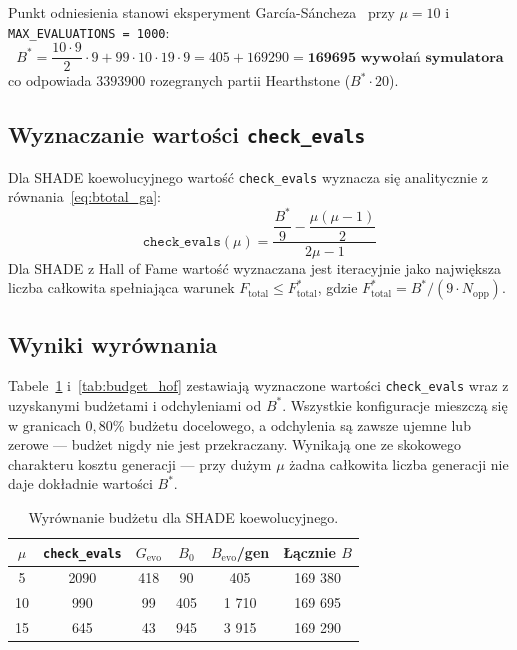 Punkt odniesienia stanowi eksperyment García-Sáncheza~\cite{sanchez2020} przy $\mu = 10$ i \texttt{MAX\_EVALUATIONS = 1000}:
\begin{equation}
    B^* = \frac{10 \cdot 9}{2} \cdot 9
        + 99 \cdot 10 \cdot 19 \cdot 9
    = 405 + 169 290
    = \mathbf{169 695 \text{ wywołań symulatora}}
    \label{eq:bstar}
\end{equation}
co odpowiada $3 393 900$ rozegranych partii Hearthstone ($B^* \cdot 20$).

\subsection{Wyznaczanie wartości \texttt{check\_evals}}

Dla SHADE koewolucyjnego wartość \texttt{check\_evals} wyznacza się analitycznie z równania~\eqref{eq:btotal_ga}:
\begin{equation}
    \texttt{check\_evals}(\mu) =
    \frac{\dfrac{B^*}{9} - \dfrac{\mu(\mu-1)}{2}}{2\mu - 1}
    \label{eq:check_coev}
\end{equation}
Dla SHADE z Hall of Fame wartość wyznaczana jest iteracyjnie jako największa liczba całkowita spełniająca warunek $F_{\text{total}} \leq F^*_{\text{total}}$, gdzie $F^*_{\text{total}} = B^* / (9 \cdot N_{\text{opp}})$.

\subsection{Wyniki wyrównania}

Tabele~\ref{tab:budget_coev} i~\ref{tab:budget_hof} zestawiają wyznaczone wartości \texttt{check\_evals} wraz z uzyskanymi budżetami i odchyleniami od $B^*$. Wszystkie konfiguracje mieszczą się w granicach $0{,}80\%$ budżetu docelowego, a odchylenia są zawsze ujemne lub zerowe --- budżet nigdy nie jest przekraczany. Wynikają one ze skokowego charakteru kosztu generacji --- przy dużym $\mu$ żadna całkowita liczba generacji nie daje dokładnie wartości $B^*$.

\begin{table}[!h]
\centering
\caption{Wyrównanie budżetu dla SHADE koewolucyjnego.}
\label{tab:budget_coev}
\begin{tabular}{cccccc}
\toprule
$\mu$ & \texttt{check\_evals} & $G_{\text{evo}}$ & $B_0$ &
$B_{\text{evo}}$/gen & Łącznie $B$ \\
\midrule
5  & 2090 & 418 & 90    & 405     & 169 380 \\
10 & 990  & 99  & 405   & 1 710 & 169 695 \\
15 & 645  & 43  & 945   & 3 915 & 169 290 \\
\bottomrule
\end{tabular}
\end{table}

